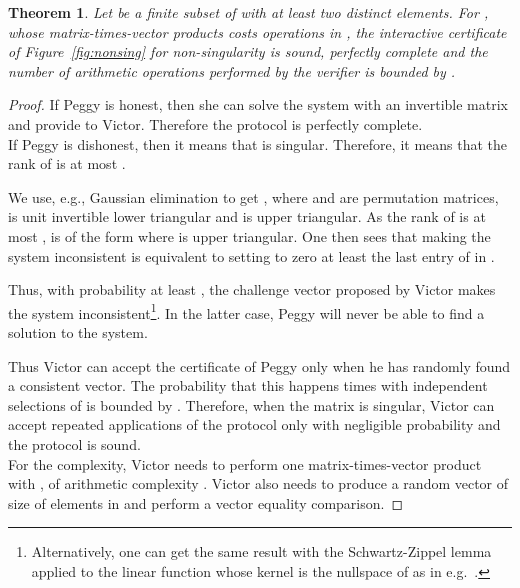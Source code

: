 \documentclass{article}
\newtheorem{theorem}{Theorem}
\begin{document}
\begin{theorem}\label{thm:nonsing}
  Let  be a finite subset of  with at least two distinct elements.
  For , whose matrix-times-vector products costs 
  operations in , the interactive certificate of Figure~\ref{fig:nonsing}
  for non-singularity is sound, perfectly complete and the number of arithmetic
  operations performed by the verifier is bounded by .
   
   
\end{theorem}
\begin{proof}
  If Peggy is honest, then she can solve the system with an
  invertible matrix and provide  to Victor. Therefore the protocol is
  perfectly complete.\\  
   
  If Peggy is dishonest, then it means that  is singular. 
  Therefore, it means that the rank of  is at most .
   
  We use, e.g., Gaussian elimination to get , 
  where  and  are permutation matrices,  is unit invertible lower
  triangular and  is upper triangular. As the rank of  is at most ,
   is of the form
   where
   is upper triangular.
  One then sees
  that making the system inconsistent is equivalent to setting to
  zero at least the last entry of  in .
   
   
  Thus, with probability at least , the challenge vector
  proposed by Victor makes the system inconsistent\footnote{Alternatively, one
    can get the same result with the Schwartz-Zippel lemma applied to the linear
    function whose kernel is the nullspace of  as in
    e.g.~\cite[Theorem~2.2]{Giesbrecht:1998:CIS}.}. 
  In the latter case, Peggy will never be able to find a solution to the
  system. 

  Thus Victor can accept the certificate of Peggy only when he
  has randomly found a consistent vector. 
  The probability that this happens  times with  independent
  selections of  is bounded by .
  Therefore, when the matrix is singular, Victor can accept repeated
  applications of the protocol only with negligible probability and the
  protocol is sound.\\

  For the complexity, Victor needs to perform one matrix-times-vector product
  with , of arithmetic complexity . 
  Victor also needs to produce a random vector of size  of elements
  in  and perform a vector equality comparison.
   
   
\end{proof}
\end{document}

